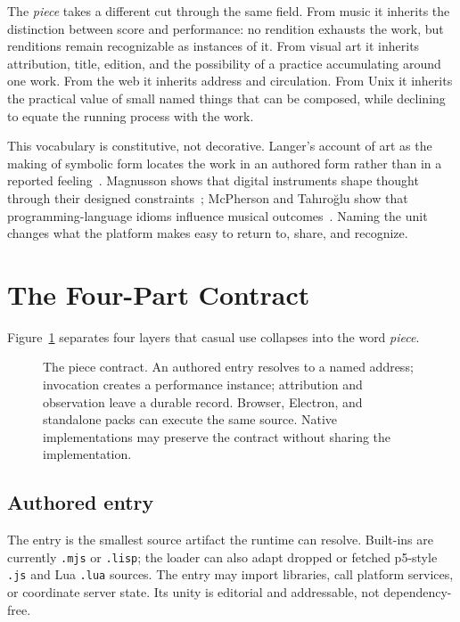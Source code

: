 \documentclass[10pt,letterpaper,twocolumn]{article}
\newcommand{\code}[1]{\texttt{#1}}
\begin{document}
The \emph{piece} takes a different cut through the same field. From music it inherits the distinction between score and performance: no rendition exhausts the work, but renditions remain recognizable as instances of it. From visual art it inherits attribution, title, edition, and the possibility of a practice accumulating around one work. From the web it inherits address and circulation. From Unix it inherits the practical value of small named things that can be composed, while declining to equate the running process with the work.

This vocabulary is constitutive, not decorative. Langer's account of art as the making of symbolic form locates the work in an authored form rather than in a reported feeling~\citep{langer1953feeling}. Magnusson shows that digital instruments shape thought through their designed constraints~\citep{magnusson2010designing}; McPherson and Tah{\i}ro{\u{g}}lu show that programming-language idioms influence musical outcomes~\citep{mcpherson2020idiomatic}. Naming the unit changes what the platform makes easy to return to, share, and recognize.

\section{The Four-Part Contract}

Figure~\ref{fig:contract} separates four layers that casual use collapses into the word \emph{piece}.

\begin{figure}[t]
\centering
\resizebox{\textwidth}{!}{}
\caption{The piece contract. An authored entry resolves to a named address; invocation creates a performance instance; attribution and observation leave a durable record. Browser, Electron, and standalone packs can execute the same source. Native implementations may preserve the contract without sharing the implementation.}
\label{fig:contract}
\end{figure}

\subsection{Authored entry}

The entry is the smallest source artifact the runtime can resolve. Built-ins are currently \code{.mjs} or \code{.lisp}; the loader can also adapt dropped or fetched p5-style \code{.js} and Lua \code{.lua} sources. The entry may import libraries, call platform services, or coordinate server state. Its unity is editorial and addressable, not dependency-free.
\end{document}
